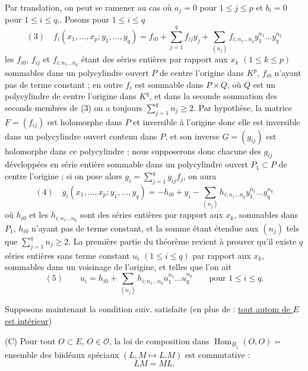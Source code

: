 Par translation, on peut se ramener au cas où $a_j=0$ pour $1\leq j\leq p$
et $b_i=0$ pour $1\leq i\leq q$,. Posons pour $1\leq i\leq q$
\[
(3)\quad
f_i(x_1,\ldots,x_p;y_1,\ldots,y_q)
=f_{i0}+\sum_{j=1}^q f_{ij}y_j
+\sum_{(n_j)}f_{i;n_1\ldots n_q}y_1^{n_1}\ldots y_q^{n_q}
\]
les $f_{i0}$, $f_{ij}$ et $f_{i;n_1\ldots n_q}$ étant des séries entières par
rapport aux $x_k$ $(1\leq k\leq p)$ sommables dans un polycylindre ouvert $P$
de centre l'origine dans $K^p$, $f_{i0}$ n'ayant pas de terme constant ;
en outre $f_i$ est sommable dans $P\times Q$, où $Q$ est un polycylindre de centre
l'origine dans $K^q$, et dans la seconde sommation des seconds membres de (3)
on a toujours $\sum_{j=1}^q n_j\geq2$.
Par hypothèse, la matrice $\underline F=(f_{ij})$ est holomorphe dans $P$ et
inversible à l'origine donc elle est inversible dans un polycylindre ouvert
contenu dans $P$, et son inverse $\underline G=(g_{ij})$ est holomorphe dans ce
polycylindre ; nous supposerons donc chacune des $g_{ij}$ développées en série
entière sommable dans un polycylindre ouvert $P_1\subset P$ de centre l'origine ;
si on pose alors $g_i=\sum_{j=1}^q g_{ij}f_j$, on aura
\[
(4)\quad
g_i(x_1,\ldots,x_p;y_1,\ldots,y_q)
=-h_{i0}+y_i-\sum_{(n_j)}h_{i;n_1\ldots n_q}y_1^{n_1}\ldots y_q^{n_q}
\]
où $h_{i0}$ et les $h_{i;n_1\ldots n_q}$ sont des séries entières par rapport
aux $x_k$, sommables dans $P_1$, $h_{i0}$ n'ayant pas de terme constant, et la
somme étant étendue aux $(n_j)$ tels que $\sum_{j=1}^q n_j\geq2$.
La première partie du théorème revient à prouver qu'il existe $q$ séries entières
sans terme constant $u_i$ $(1\leq i\leq q)$ par rapport aux $x_k$, sommables dans
un voisinage de l'origine, et telles que l'on ait
\[
(5)\qquad
u_i=h_{i0}+\sum_{(n_j)}h_{i;n_1\ldots n_q}u_1^{n_1}\ldots u_q^{n_q}
\qquad\text{pour }1\leq i\leq q.
\]


Supposons maintenant la condition suiv. satisfaite
(en plus de : \uline{tout autom de $E$ est intérieur})

(C) Pour tout $O\subset E$, $O\in\mathcal O$, la loi de composition
dans $\operatorname{Hom}_{\underline B_1}(O,O)=$ ensemble des
biidéaux spéciaux
 
$(L,M\mapsto L.M)$ est commutative :
\[
LM=ML.
\]


